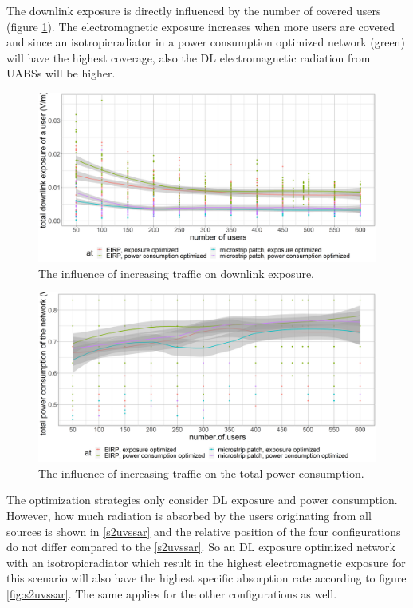 The downlink exposure is directly influenced by the number of covered users (figure \ref{fig:s2uvsdl}). 
The electromagnetic exposure increases when more users are covered and since an \gls{isotropicradiator} in a power consumption optimized network (green)
will have the highest coverage, also the \gls{DL} electromagnetic radiation from \gls{UABS}s will be higher.

\begin{figure}[h!]
  \includegraphics[width=\textwidth]{../results/s2/uvsdl.png}
  \caption{The influence of increasing traffic on downlink exposure.}
  \label{fig:s2uvsdl}
\end{figure}

\begin{figure}[h!]
  \includegraphics[width=\textwidth]{../results/s2/uvspc.png}
  \caption{The influence of increasing traffic on the total power consumption.}
  \label{fig:s2uvspc}
\end{figure}

The optimization strategies only consider \gls{DL} exposure and power consumption.
However, how much radiation is absorbed by the users originating from all sources is shown in \ref{s2uvssar} and the relative position of 
the four configurations do not differ compared to the \ref{s2uvssar}. So an \gls{DL} exposure optimized network with an \gls{isotropicradiator}
 which result in the highest electromagnetic exposure for this scenario will also have the highest specific absorption rate according to figure
 \ref{fig:s2uvssar}. The same applies for the other configurations as well.

